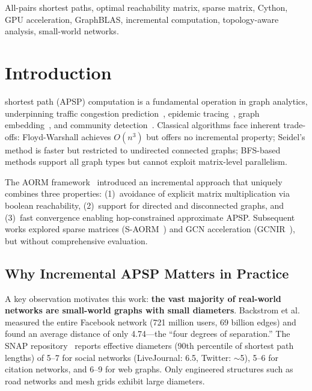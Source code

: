 \documentclass[journal]{IEEEtran}
\begin{document}
\begin{IEEEkeywords}
All-pairs shortest paths, optimal reachability matrix, sparse matrix, Cython, GPU acceleration, GraphBLAS, incremental computation, topology-aware analysis, small-world networks.
\end{IEEEkeywords}


\section{Introduction}

 shortest path (APSP) computation is a fundamental operation in graph analytics, underpinning traffic congestion prediction~\cite{kim2020traffic}, epidemic tracing~\cite{kapoor2020covid}, graph embedding~\cite{zhang2018proximity}, and community detection~\cite{newman2006modularity}. Classical algorithms face inherent trade-offs: Floyd-Warshall achieves $O(n^3)$ but offers no incremental property; Seidel's method is faster but restricted to undirected connected graphs; BFS-based methods support all graph types but cannot exploit matrix-level parallelism.

The AORM framework~\cite{aorm2021} introduced an incremental approach that uniquely combines three properties: (1)~avoidance of explicit matrix multiplication via boolean reachability, (2)~support for directed and disconnected graphs, and (3)~fast convergence enabling hop-constrained approximate APSP. Subsequent works explored sparse matrices (S-AORM~\cite{saorm2022}) and GCN acceleration (GCNIR~\cite{gcnir2023}), but without comprehensive evaluation.

\subsection{Why Incremental APSP Matters in Practice}

A key observation motivates this work: \textbf{the vast majority of real-world networks are small-world graphs with small diameters}. Backstrom et al.~\cite{backstrom2012} measured the entire Facebook network (721 million users, 69 billion edges) and found an average distance of only 4.74---the ``four degrees of separation.'' The SNAP repository~\cite{snap} reports effective diameters (90th percentile of shortest path lengths) of 5--7 for social networks (LiveJournal: 6.5, Twitter: $\sim$5), 5--6 for citation networks, and 6--9 for web graphs. Only engineered structures such as road networks and mesh grids exhibit large diameters.
\end{document}
